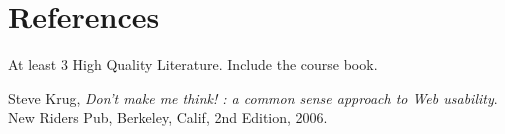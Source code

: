 \chapter{References}

At least 3 High Quality Literature. Include the course book.
 
\begin{thebibliography}{9}

  Steve Krug,
  \emph{Don't make me think! : a common sense approach to Web usability}.
  New Riders Pub, Berkeley, Calif,
  2nd Edition,
  2006.

\end{thebibliography}